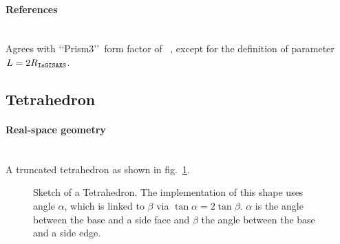 \paragraph{References}\strut\\
Agrees with \lq\lq Prism3\rq\rq\ form factor of \IsGISAXS~\cite{Laz02},
except for the definition of parameter $L= 2 R_{\rm{\texttt{IsGISAXS}}}$.

\newpage
\subsection{Tetrahedron} 
 
\paragraph{Real-space geometry}\strut\\
A truncated tetrahedron as shown in fig.~\ref{fig:tetrahedron}.

\begin{figure}[ht]
\hfill
{}
\hfill
{}
\hfill
\caption{Sketch of a Tetrahedron. The implementation of this shape uses angle
  $\alpha$, which is linked to $\beta$ via $\tan \alpha = 2 \tan 
  \beta$. $\alpha$ is the angle between the base and a side face and $\beta$
  the angle between the base and a side edge.}
\label{fig:tetrahedron}
\end{figure}

